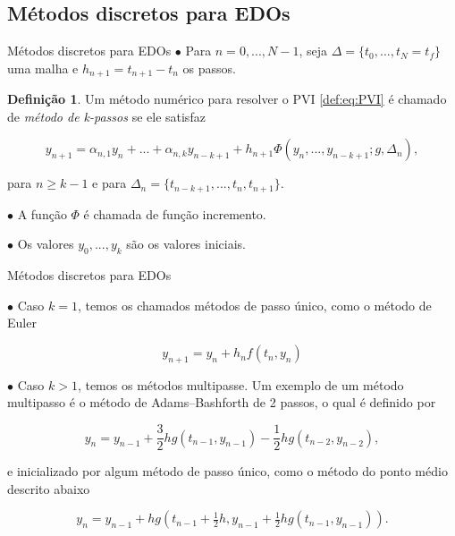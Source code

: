 \documentclass{beamer}
\theoremstyle{plain}
\theoremstyle{definition}
\newtheorem{defi}{Definição}
\begin{document}


\subsection{Métodos discretos para EDOs}


\begin{frame}{Métodos discretos para EDOs}
    \small
    \phantom{aa} $\bullet$ Para $n = 0, ..., N-1$, seja $\Delta = \{ t_0, ..., t_N = t_f\}$ uma malha e $h_{n+1} = t_{n+1} - t_n$ os passos.

    \begin{defi}
        Um método numérico para resolver o PVI \eqref{def:eq:PVI} é chamado de \textit{método de k-passos} se ele satisfaz 

        \begin{equation}
            y_{n+1} = \alpha_{n, 1} y_n + ... + \alpha_{n, k} y_{n - k + 1} + h_{n+1} \Phi( y_n, ..., y_{n-k+1}; g, \Delta_n), 
            \label{chap3:def:eq:ODE_method}
        \end{equation}

        para $n \geq k - 1$ e para $\Delta_n = \{ t_{n - k + 1}, ..., t_n, t_{n+1}\} $.

    \end{defi}

    \phantom{aa} $\bullet$ A função $\Phi$ é chamada de função incremento.

    \phantom{aa} $\bullet$ Os valores $y_0, ..., y_k$ são os valores iniciais.



\end{frame}


\begin{frame}{Métodos discretos para EDOs}

    \phantom{aa} $\bullet$ Caso $k = 1$, temos os chamados métodos de passo único, como o método de Euler 

    \[
        y_{n+1} = y_n + h_n f(t_n, y_n)
    \]

    \phantom{aa} $\bullet$ Caso $k > 1$, temos os métodos multipasse. Um exemplo de um método multipasso é o método de Adams–Bashforth de 2 passos, o qual é definido por 

    \[
        y_{n} = y_{n-1} + \frac{3}{2} h g(t_{n-1},y_{n-1}) - \frac{1}{2} hg(t_{n-2},y_{n-2}),
    \]

    \noindent
    e  inicializado por algum método de passo único, como o método do ponto médio descrito abaixo

    \[
        y_{n}=y_{n-1}+hg\left(t_{n-1}+{\tfrac {1}{2}}h,y_{n-1}+{\tfrac {1}{2}}hg(t_{n-1},y_{n-1})\right).
    \]
\end{frame}
\end{document}
